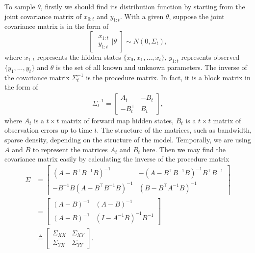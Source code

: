 To sample $\theta$, firstly we should find its distribution function by starting from the joint covariance matrix of $x_{0:t}$ and $y_{1:t}$. With a given $\theta$, suppose the joint covariance matrix is in the form of 
\begin{equation}\label{generaljointmatrix}
\begin{bmatrix} \begin{matrix} x_{1:t}\\ y_{1:t}  \end{matrix} \biggr\rvert \theta \end{bmatrix}
\sim N\left(0, \Sigma_t \right),
\end{equation}
where $x_{1:t}$ represents the hidden states $\{x_0,x_1,\dots,x_t\}$, $y_{1:t}$ represents observed $\{y_1,\dots,y_t\}$ and $\theta$ is the set of all known and unknown parameters. The inverse of the covariance matrix $\Sigma_t^{-1}$ is the procedure matrix. In fact, it is a block matrix in the form of 
\begin{align*} \Sigma_t^{-1}=
\begin{bmatrix}
A_t& -B_t \\ -B_t^\top & B_t
\end{bmatrix}, 
\end{align*}
where $A_t$ is a $t \times t$ matrix of forward map hidden states, $B_t$ is a $t\times t$ matrix of observation errors up to time $t$. The structure of the matrices, such as bandwidth, sparse density, depending on the structure of the model. Temporally, we are using $A$ and $B$ to represent the matrices  $A_t$ and $B_t$ here. Then we may find the covariance matrix easily by calculating the inverse of the procedure matrix 
\begin{align*}
\Sigma &= \begin{bmatrix}
(A-B^\top B^{-1}B) ^{-1} & -(A-B^\top B^{-1}B)^{-1}B^\top B^{-1}\\
- B^{-1}B(A-B^\top B^{-1}B)^{-1} & (B-B^\top A^{-1}B) ^{-1}
\end{bmatrix} \\
&= \begin{bmatrix}
(A-B) ^{-1} & (A-B)^{-1}\\
(A-B)^{-1} & (I- A^{-1}B) ^{-1}B^{-1}
\end{bmatrix} \\
&\triangleq \begin{bmatrix}
\Sigma_{XX} & \Sigma_{XY} \\
\Sigma_{YX}  &\Sigma_{YY} 
\end{bmatrix}.
\end{align*}
